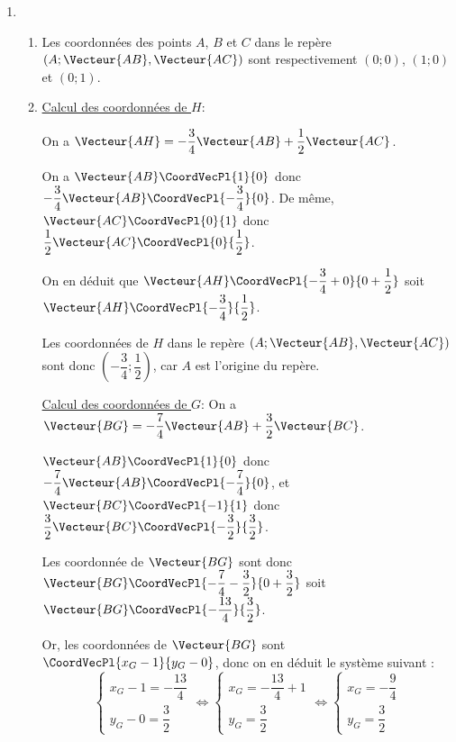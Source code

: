 \documentclass[a4paper]{article}
\begin{document}
\begin{exercice}{}{}
\begin{enumerate}
\begin{center}
      \end{center}

      \item \begin{enumerate}
        \item Les coordonnées des points $A$, $B$ et $C$ dans le repère $(A ; \Vecteur{AB}, \Vecteur{AC})$ sont respectivement $(0 ; 0)$, $(1 ; 0)$ et $( 0; 1)$.
        \item 
        \underline{Calcul des coordonnées de $H$}:

                
        On a $\Vecteur{AH}= -\dfrac{3}{4} \Vecteur{AB} + \dfrac{1}{2} \Vecteur{AC}$.
        
        On a $\Vecteur{AB}\CoordVecPl{1}{0}$ donc $-\dfrac{3}{4} \Vecteur{AB}\CoordVecPl{-\dfrac{3}{4}}{0}$. De même, $\Vecteur{AC}\CoordVecPl{0}{1}$ donc $\dfrac{1}{2} \Vecteur{AC}\CoordVecPl{0}{\dfrac{1}{2}}$.

        On en déduit que $\Vecteur{AH}\CoordVecPl{-\dfrac{3}{4}+0}{0+\dfrac{1}{2}}$ soit $\Vecteur{AH}\CoordVecPl{-\dfrac{3}{4}}{\dfrac{1}{2}}$.

         Les coordonnées de $H$ dans le repère $(A ; \Vecteur{AB}, \Vecteur{AC})$ sont donc $(-\dfrac{3}{4} ; \dfrac{1}{2})$, car $A$ est l'origine du repère.



        \underline{Calcul des coordonnées de $G$}:
      On a $\Vecteur{BG}= -\dfrac{7}{4} \Vecteur{AB} + \dfrac{3}{2} \Vecteur{BC}$.

        $\Vecteur{AB}\CoordVecPl{1}{0}$ donc $-\dfrac{7}{4} \Vecteur{AB}\CoordVecPl{-\dfrac{7}{4}}{0}$, et $\Vecteur{BC}\CoordVecPl{-1}{1}$ donc $\dfrac{3}{2} \Vecteur{BC}\CoordVecPl{-\dfrac{3}{2}}{\dfrac{3}{2}}$.

        Les coordonnée de $\Vecteur{BG}$ sont donc $\Vecteur{BG}\CoordVecPl{-\dfrac{7}{4}-\dfrac{3}{2}}{0+\dfrac{3}{2}}$ soit $\Vecteur{BG}\CoordVecPl{-\dfrac{13}{4}}{\dfrac{3}{2}}$.

        Or, les coordonnées de $\Vecteur{BG}$ sont $\CoordVecPl{x_G-1}{y_G-0}$, donc on en déduit le système suivant :
        $$\begin{cases}
          x_G-1=-\dfrac{13}{4}\\
          y_G-0=\dfrac{3}{2}
        \end{cases} \iff \begin{cases}
          x_G=-\dfrac{13}{4}+1\\
          y_G=\dfrac{3}{2}
        \end{cases}\iff \begin{cases}
          x_G=-\dfrac{9}{4}\\
          y_G=\dfrac{3}{2}
        \end{cases}$$


\end{enumerate}
\end{enumerate}
\end{exercice}
\end{document}

